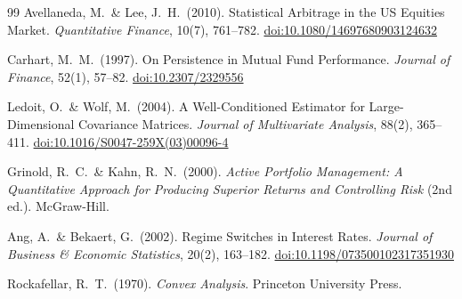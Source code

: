 \documentclass[12pt,openany]{book}
\numberwithin{equation}{chapter}
\theoremstyle{plain}
\theoremstyle{definition}
\theoremstyle{remark}
\numberwithin{equation}{chapter}
\theoremstyle{plain}
\begin{document}
\begin{thebibliography}{99}
Avellaneda, M.\ \& Lee, J.\ H.\ (2010).
Statistical Arbitrage in the US Equities Market.
\textit{Quantitative Finance}, 10(7), 761--782.
\href{https://doi.org/10.1080/14697680903124632}{doi:10.1080/14697680903124632}

Carhart, M.\ M.\ (1997).
On Persistence in Mutual Fund Performance.
\textit{Journal of Finance}, 52(1), 57--82.
\href{https://doi.org/10.2307/2329556}{doi:10.2307/2329556}

Ledoit, O.\ \& Wolf, M.\ (2004).
A Well-Conditioned Estimator for Large-Dimensional Covariance Matrices.
\textit{Journal of Multivariate Analysis}, 88(2), 365--411.
\href{https://doi.org/10.1016/S0047-259X(03)00096-4}{doi:10.1016/S0047-259X(03)00096-4}

Grinold, R.\ C.\ \& Kahn, R.\ N.\ (2000).
\textit{Active Portfolio Management: A Quantitative Approach for
Producing Superior Returns and Controlling Risk} (2nd ed.).
McGraw-Hill.

Ang, A.\ \& Bekaert, G.\ (2002).
Regime Switches in Interest Rates.
\textit{Journal of Business \& Economic Statistics}, 20(2), 163--182.
\href{https://doi.org/10.1198/073500102317351930}{doi:10.1198/073500102317351930}

Rockafellar, R.\ T.\ (1970).
\textit{Convex Analysis}.
Princeton University Press.

\end{thebibliography}
\end{document}
